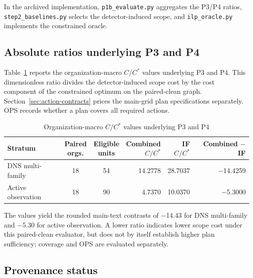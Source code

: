 \documentclass[sn-basic]{sn-jnl}%
\theoremstyle{thmstyleone}%
\theoremstyle{thmstyletwo}%
\theoremstyle{thmstylethree}%
\begin{document}
\begin{appendices}
\begin{enumerate}
\end{enumerate}

In the archived implementation, \texttt{p1b\_evaluate.py} aggregates the P3/P4 ratios, \texttt{step2\_baselines.py} selects the detector-induced scope, and \texttt{ilp\_oracle.py} implements the constrained oracle.

\subsection{Absolute ratios underlying P3 and P4}\label{app:c-2}

Table~\ref{tab:app-c1} reports the organization-macro \(C/C^{*}\) values underlying P3 and P4. This dimensionless ratio divides the detector-induced scope cost by the cost component of the constrained optimum on the paired-clean graph. Section~\ref{sec:action-contracts} prices the main-grid plan specifications separately. OPS records whether a plan covers all required actions.

\begin{table}[htbp]
\centering
\caption{Organization-macro \(C/C^{*}\) values underlying P3 and P4}
\label{tab:app-c1}
\small
\setlength{\tabcolsep}{3pt}
\renewcommand{\arraystretch}{1.1}
\begin{tabularx}{\linewidth}{@{}Xccrrr@{}}
\toprule
Stratum & \shortstack{Paired\\orgs.} & \shortstack{Eligible\\units} & \shortstack{Combined\\\(C/C^{*}\)} & \shortstack{IF\\\(C/C^{*}\)} & \shortstack{Combined\\\ensuremath{-} IF} \\
\midrule
DNS multi-family & 18 & 54 & 14.2778 & 28.7037 & \ensuremath{-}14.4259 \\
Active observation & 18 & 90 & 4.7370 & 10.0370 & \ensuremath{-}5.3000 \\
\bottomrule
\end{tabularx}
\end{table}

The values yield the rounded main-text contrasts of \ensuremath{-}14.43 for DNS multi-family and \ensuremath{-}5.30 for active observation. A lower ratio indicates lower scope cost under this paired-clean evaluator, but does not by itself establish higher plan sufficiency; coverage and OPS are evaluated separately.

\subsection{Provenance status}\label{app:c-3}


\end{appendices}
\end{document}
